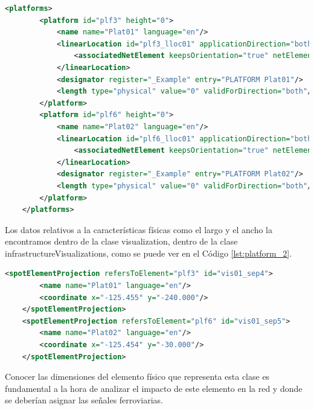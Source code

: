     \begin{lstlisting}[language = XML, caption = Clase \textit{Platform} , label = {lst:platform_1}]
    <platforms>
        <platform id="plf3" height="0">
            <name name="Plat01" language="en"/>
            <linearLocation id="plf3_lloc01" applicationDirection="both">
                <associatedNetElement keepsOrientation="true" netElementRef="ne1"/>
            </linearLocation>
            <designator register="_Example" entry="PLATFORM Plat01"/>
            <length type="physical" value="0" validForDirection="both"/>
        </platform>
        <platform id="plf6" height="0">
            <name name="Plat02" language="en"/>
            <linearLocation id="plf6_lloc01" applicationDirection="both">
                <associatedNetElement keepsOrientation="true" netElementRef="ne3"/>
            </linearLocation>
            <designator register="_Example" entry="PLATFORM Plat02"/>
            <length type="physical" value="0" validForDirection="both"/>
        </platform>
    </platforms>
    \end{lstlisting}

    Los datos relativos a la características físicas como el largo y el ancho la encontramos dentro de la clase visualization, dentro de la clase infrastructureVisualizations, como se puede ver en el Código \ref{lst:platform_2}.

    \begin{lstlisting}[language = XML, caption = Clase \textit{Visualization} , label = {lst:platform_2}]
    <spotElementProjection refersToElement="plf3" id="vis01_sep4">
        <name name="Plat01" language="en"/>
        <coordinate x="-125.455" y="-240.000"/>
    </spotElementProjection>
    <spotElementProjection refersToElement="plf6" id="vis01_sep5">
        <name name="Plat02" language="en"/>
        <coordinate x="-125.454" y="-30.000"/>
    </spotElementProjection>
    \end{lstlisting}

    Conocer las dimensiones del elemento físico que representa esta clase es fundamental a la hora de analizar el impacto de este elemento en la red y donde se deberían asignar las señales ferroviarias.